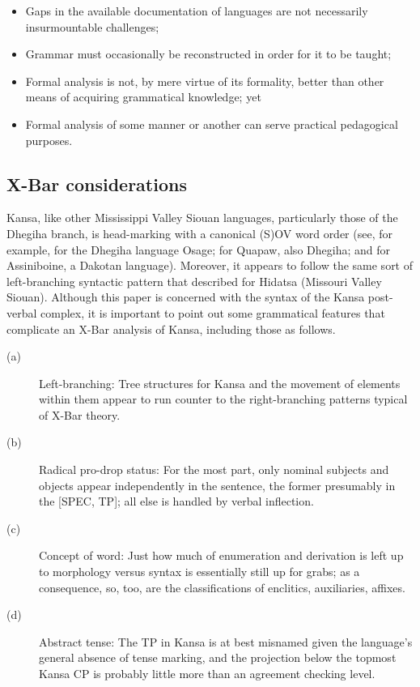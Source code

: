 \documentclass[output=paper]{LSP/langsci}
\begin{document}
\begin{itemize}
\item Gaps in the available documentation of languages are not necessarily insurmountable challenges;
\item Grammar must occasionally be reconstructed in order for it to be taught;
\item Formal analysis is not, by mere virtue of its formality, better than other means of acquiring grammatical knowledge; yet
\item Formal analysis of some manner or another can serve practical pedagogical purposes.
\end{itemize}

\subsection{X-Bar considerations}
Kansa, like other Mississippi Valley Siouan languages, particularly those of the Dhegiha branch, is head-marking with a canonical (S)OV word order (see, for example, \citet[421]{Quintero2004} for the Dhegiha language Osage; \citet[488--490]{Rankin2005b} for Quapaw, also Dhegiha; and \citet[369]{Cumberland2005} for Assiniboine, a Dakotan language). Moreover, it appears to follow the same sort of left-branching syntactic pattern that \citet{Boyle2007} described for Hidatsa (Missouri Valley Siouan). Although this paper is concerned with the syntax of the Kansa post-verbal complex, it is important to point out some grammatical features that complicate an X-Bar analysis of Kansa, including those as follows.

\begin{description}
\item[(a)]	Left-branching: Tree structures for Kansa and the movement of elements within them appear to run counter to the right-branching patterns typical of X-Bar theory.

\item[(b)]	Radical pro-drop status: For the most part, only nominal subjects and objects appear independently in the sentence, the former presumably in the [SPEC, TP]; all else is handled by verbal inflection. 

\item[(c)]	Concept of word: Just how much of enumeration and derivation is left up to morphology versus syntax is essentially still up for grabs; as a consequence, so, too, are the classifications of enclitics, auxiliaries, affixes. 

\item[(d)]	Abstract tense: The TP in Kansa is at best misnamed given the language's general absence of tense marking, and the projection below the topmost Kansa CP is probably little more than an agreement checking level.
\end{description}
\end{document}
